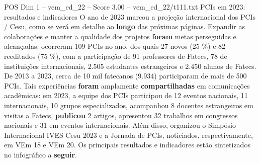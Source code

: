 \begin{textsample}{POS Dim 1 – vem\_ed\_22 – Score 3.00 – vem\_ed\_22/t111.txt}  \label{ex:f1_pos_176}
PCIs em 2023: resultados e indicadores O ano de 2023 marcou a projeção internacional dos PCIs / Cesu, como se verá em detalhe ao \textbf{longo} das próximas páginas.
Expandir as colaborações e manter a qualidade dos projetos \textbf{foram} metas perseguidas e alcançadas: ocorreram 109 PCIs no ano, dos quais 27 novos (25 \%) e 82 reeditados (75 \%), com a participação de 91 professores de Fatecs, 78 de instituições internacionais, 2.505 estudantes estrangeiros e 2.450 alunos de Fatecs.
De 2013 a 2023, cerca de 10 mil fatecanos (9.934) participaram de mais de 500 PCIs.
Tais experiências \textbf{foram} amplamente \textbf{compartilhadas} em comunicações acadêmicas: em 2023, a equipe dos PCIs participou de 12 eventos nacionais, 11 internacionais, 10 grupos especializados, acompanhou 8 docentes estrangeiros em visitas a Fatecs, \textbf{publicou} 2 artigos, apresentou 32 trabalhos em congressos nacionais e 31 em eventos internacionais.
Além disso, organizou o Simpósio Internacional IVES Cesu 2023 e a Jornada de PCIs, noticiados, respectivamente, em VEm 18 e VEm 20.
Os principais resultados e indicadores estão sintetizados no infográfico a \textbf{seguir}.

\end{textsample}

